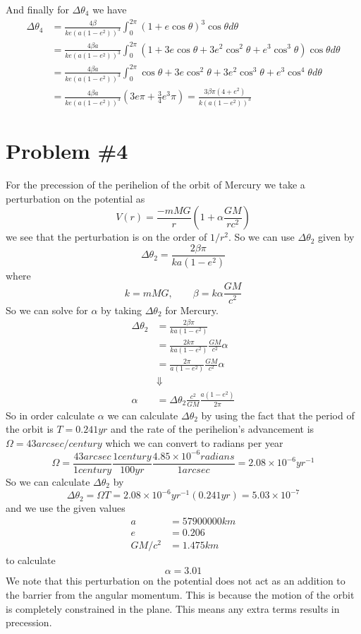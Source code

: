\documentclass[11pt]{article}
\numberwithin{equation}{section}
\begin{document}
And finally for $\Delta\theta_4$ we have
\begin{align*}
\Delta\theta_{4} &= \frac{4\beta }{ke(a(1-e^2))^{3}}\int_{0}^{2\pi}(1+e\cos\theta)^{3}\cos\theta d\theta\\
&= \frac{4\beta a}{ke(a(1-e^2))^{3}}\int_{0}^{2\pi}(1+3e\cos\theta+3e^2\cos^2\theta+e^3\cos^3\theta)\cos\theta d\theta\\
&= \frac{4\beta a}{ke(a(1-e^2))^{3}}\int_{0}^{2\pi}\cos\theta+3e\cos^2\theta+3e^2\cos^3\theta+e^3\cos^4\theta d\theta\\
&= \frac{4\beta a}{ke(a(1-e^2))^{3}}\left(3e\pi + \frac{3}{4}e^3\pi\right) = \frac{3\beta \pi(4+e^2)}{k(a(1-e^2))^{3}}
\end{align*}
\pagebreak

\section{Problem \#4}
For the precession of the perihelion of the orbit of Mercury we take a perturbation on the
potential as
$$V(r) = \frac{-mMG}{r}\left(1+\alpha\frac{GM}{rc^2}\right)$$ 
we see that the perturbation is on the order of $1/r^2$. So we can use $\Delta\theta_2$ 
given by
$$\Delta\theta_2 = \frac{2\beta \pi}{ka(1-e^2)}$$
where
$$k = mMG,\qquad \beta = k\alpha\frac{GM}{c^2}$$
So we can solve for $\alpha$ by taking $\Delta\theta_2$ for Mercury.
\begin{align*}
\Delta\theta_2 &= \frac{2\beta \pi}{ka(1-e^2)}\\
&= \frac{2 k\pi}{ka(1-e^2)}\frac{GM}{c^2}\alpha\\
&= \frac{2 \pi}{a(1-e^2)}\frac{GM}{c^2}\alpha\\
&\Downarrow\\
\alpha &= \Delta\theta_2\frac{c^2}{GM}\frac{a(1-e^2)}{2\pi}
\end{align*}
So in order calculate $\alpha$ we can calculate $\Delta\theta_2$ by using the fact that
the period of the orbit is $T=0.241\unit{yr}$ and the rate of the perihelion's advancement 
is $\Omega = 43\unit{arcsec/century}$ which we can convert to radians per year
$$\Omega = \frac{43\unit{arcsec}}{1\unit{century}}\frac{1\unit{century}}{100\unit{yr}}\frac{4.85\times10^{-6}\unit{radians}}{1\unit{arcsec}}=2.08\times10^{-6}\unit{yr^{-1}}$$
So we can calculate $\Delta\theta_2$ by
$$\Delta\theta_2 = \Omega T = 2.08\times10^{-6}\unit{yr^{-1}}(0.241\unit{yr}) = 5.03\times10^{-7}$$
and we use the given values 
\begin{align*}
a &= 57900000\unit{km}\\
e &= 0.206\\
GM/c^2 &= 1.475\unit{km}
\end{align*}
to calculate
$$\alpha = 3.01$$
We note that this perturbation on the potential does not act as an addition to the barrier 
from the angular momentum. This is because the motion of the orbit is completely constrained
in the plane. This means any extra terms results in precession.
\end{document}
